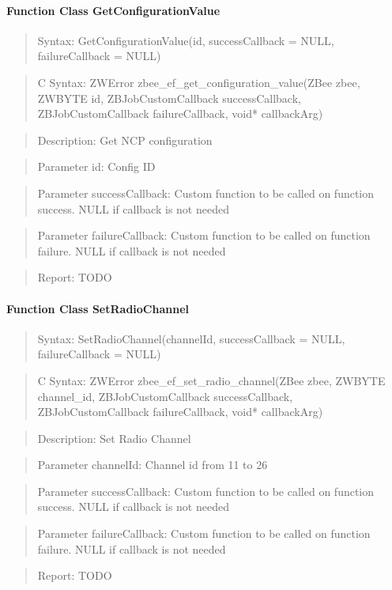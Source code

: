 \paragraph{Function Class GetConfigurationValue}
\begin{quote}Syntax: GetConfigurationValue(id, successCallback = NULL, failureCallback = NULL)\end{quote}
\begin{quote}C Syntax: ZWError zbee\_ef\_get\_configuration\_value(ZBee zbee, ZWBYTE id, ZBJobCustomCallback successCallback, ZBJobCustomCallback failureCallback, void* callbackArg)\end{quote}
\begin{quote}Description: Get NCP configuration\end{quote}
\begin{quote}Parameter id: Config ID\end{quote}
\begin{quote}Parameter successCallback: Custom function to be called on function success. NULL if callback is not needed\end{quote}
\begin{quote}Parameter failureCallback: Custom function to be called on function failure. NULL if callback is not needed\end{quote}
\begin{quote}Report: TODO\end{quote}

\paragraph{Function Class SetRadioChannel}
\begin{quote}Syntax: SetRadioChannel(channelId, successCallback = NULL, failureCallback = NULL)\end{quote}
\begin{quote}C Syntax: ZWError zbee\_ef\_set\_radio\_channel(ZBee zbee, ZWBYTE channel\_id, ZBJobCustomCallback successCallback, ZBJobCustomCallback failureCallback, void* callbackArg)\end{quote}
\begin{quote}Description: Set Radio Channel\end{quote}
\begin{quote}Parameter channelId: Channel id from 11 to 26\end{quote}
\begin{quote}Parameter successCallback: Custom function to be called on function success. NULL if callback is not needed\end{quote}
\begin{quote}Parameter failureCallback: Custom function to be called on function failure. NULL if callback is not needed\end{quote}
\begin{quote}Report: TODO\end{quote}

